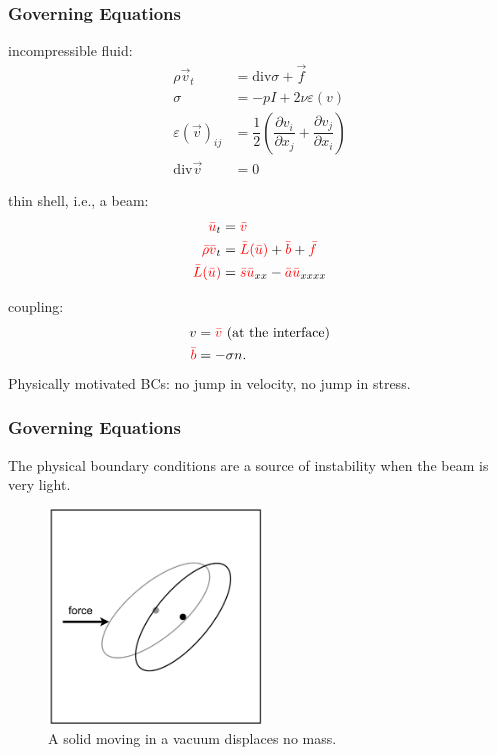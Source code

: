 \documentclass[8pt]{beamer}
\newcommand{\leftd}[1]{{\color{red} \bar{#1}}}
\newcommand{\leftdd}[2]{{\color{red} \bar{#1}(\bar{#2})}}
\newcommand{\divergence}{\mathrm{div}}
\begin{document}
\begin{frame}
    \frametitle{Governing Equations}
    incompressible fluid:
    \begin{align}
        \rho \vec{v}_t &= \divergence \sigma + \vec{f}                        \\
        \sigma &= -p I + 2 \nu \varepsilon(v)                                 \\
        \varepsilon(\vec{v})_{ij} &= \dfrac{1}{2}
        \left(
        \dfrac{\partial v_i}{\partial x_j} +
        \dfrac{\partial v_j}{\partial x_i}
        \right)                                                               \\
        \divergence \vec{v} &= 0
    \end{align}

    thin shell, i.e., a beam:
    \begin{align}
        \leftd{u}_t              &= \leftd{v}                                 \\
        \leftd{\rho} \leftd{v}_t &= \leftdd{L}{u} + \leftd{b} + \leftd{f}     \\
        \leftdd{L}{u}            &= \leftd{s} \leftd{u}_{xx}
        - \leftd{a} \leftd{u}_{xxxx}
    \end{align}

    \pause
    coupling:
    \begin{align}
        v &= \leftd{v} \text{ (at the interface)}                             \\
        \leftd{b} &= -\sigma n.
    \end{align}
    \pause
    Physically motivated BCs: no jump in velocity, no jump in stress.
\end{frame}

\begin{frame}
    \frametitle{Governing Equations}
    The physical boundary conditions are a source of instability when the beam
    is very light.

    \begin{figure}
        \centering
        \includegraphics[width=2.25in]{left.png}

        \caption{A solid moving in a vacuum displaces no mass.}
    \end{figure}
\end{frame}
\end{document}
